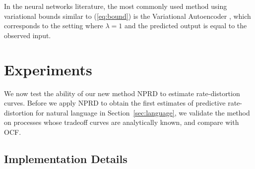 \documentclass[entropy,article,submit,moreauthors,pdftex,10pt,a4paper]{Definitions/mdpi}
\begin{document}
In the neural networks literature, the most commonly used method using variational bounds similar to (\ref{eq:bound}) is the Variational Autoencoder \citep{kingma-auto-encoding-2014}, which corresponds to the setting where $\lambda=1$ and the predicted output is equal to the observed input.






\section{Experiments}\label{sec:experiments}
We now test the ability of our new method NPRD to estimate rate-distortion curves.
Before we apply NPRD to obtain the first estimates of predictive rate-distortion for natural language in Section~\ref{sec:language}, we validate the method on processes whose tradeoff curves are analytically known, and compare with OCF.

\subsection{Implementation Details}
\end{document}
